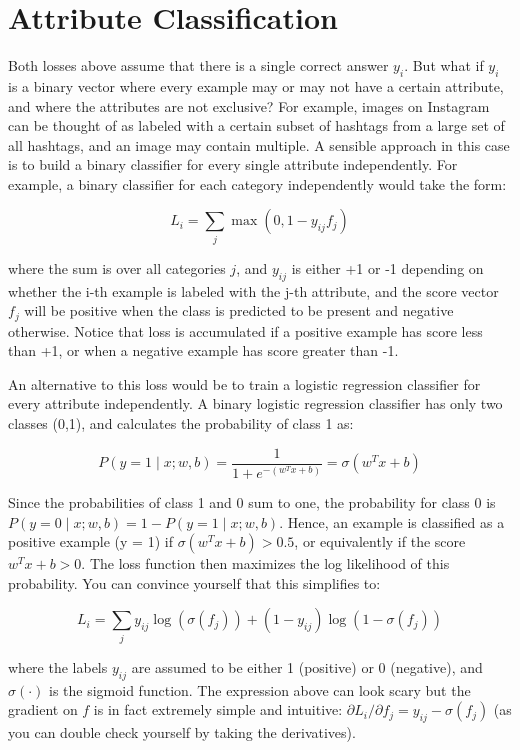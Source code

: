 \section*{Attribute Classification}
Both losses above assume that there is a single correct answer $y_i$. But what if $y_i$ is a binary vector where every example may or may not have a certain attribute, and where the attributes are not exclusive? For example, images on Instagram can be thought of as labeled with a certain subset of hashtags from a large set of all hashtags, and an image may contain multiple. A sensible approach in this case is to build a binary classifier for every single attribute independently. For example, a binary classifier for each category independently would take the form:

\begin{equation}
L_i = \sum_j \max(0, 1 - y_{ij} f_j)
\end{equation}

where the sum is over all categories $j$, and $y_{ij}$ is either +1 or -1 depending on whether the i-th example is labeled with the j-th attribute, and the score vector $f_j$ will be positive when the class is predicted to be present and negative otherwise. Notice that loss is accumulated if a positive example has score less than +1, or when a negative example has score greater than -1.

An alternative to this loss would be to train a logistic regression classifier for every attribute independently. A binary logistic regression classifier has only two classes (0,1), and calculates the probability of class 1 as:

\begin{equation}
P(y = 1 \mid x; w, b) = \frac{1}{1 + e^{-(w^Tx +b)}} = \sigma (w^Tx + b)
\end{equation}

Since the probabilities of class 1 and 0 sum to one, the probability for class 0 is $P(y = 0 \mid x; w, b) = 1 - P(y = 1 \mid x; w,b)$. Hence, an example is classified as a positive example (y = 1) if $\sigma (w^Tx + b) > 0.5$, or equivalently if the score $w^Tx +b > 0$. The loss function then maximizes the log likelihood of this probability. You can convince yourself that this simplifies to:

\begin{equation}
L_i = \sum_j y_{ij} \log(\sigma(f_j)) + (1 - y_{ij}) \log(1 - \sigma(f_j))
\end{equation}

where the labels $y_{ij}$ are assumed to be either 1 (positive) or 0 (negative), and $\sigma(\cdot)$ is the sigmoid function. The expression above can look scary but the gradient on $f$ is in fact extremely simple and intuitive: $\partial{L_i} / \partial{f_j} = y_{ij} - \sigma(f_j)$ (as you can double check yourself by taking the derivatives).

